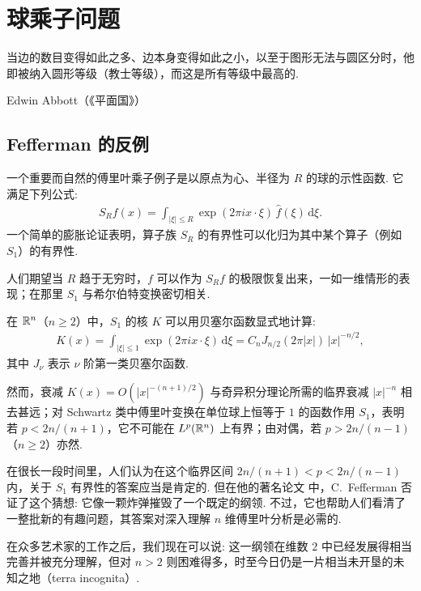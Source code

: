 
\chapter{球乘子问题}

\epigraph{当边的数目变得如此之多、边本身变得如此之小，以至于图形无法与圆区分时，他即被纳入圆形等级（教士等级），而这是所有等级中最高的.}{Edwin Abbott（《平面国》）}

\section{Fefferman 的反例}

一个重要而自然的傅里叶乘子例子是以原点为心、半径为 $R$ 的球的示性函数. 它满足下列公式:
\begin{align*}
  S_{R}f(x)=\int_{|\xi|\leq R}\exp(2\pi i x\cdot\xi)\,\widehat{f}(\xi)\,\mathrm{d}\xi.
\end{align*}
一个简单的膨胀论证表明，算子族 $S_{R}$ 的有界性可以化归为其中某个算子（例如 $S_{1}$）的有界性.

人们期望当 $R$ 趋于无穷时，$f$ 可以作为 $S_{R}f$ 的极限恢复出来，一如一维情形的表现；在那里 $S_{1}$ 与希尔伯特变换密切相关.

在 $\mathbb{R}^n$（$n \geq 2$）中，$S_1$ 的核 $K$ 可以用贝塞尔函数显式地计算:
\begin{align*}
  K(x)=\int_{|\xi|\leq 1}\exp(2\pi i x\cdot\xi)\,\mathrm{d}\xi=C_{n}J_{n/2}(2\pi|x|)\,|x|^{-n/2},
\end{align*}
其中 $J_{\nu}$ 表示 $\nu$ 阶第一类贝塞尔函数.

然而，衰减 $K(x) = O(|x|^{-(n+1)/2})$ 与奇异积分理论所需的临界衰减 $|x|^{-n}$ 相去甚远；对 Schwartz 类中傅里叶变换在单位球上恒等于 $1$ 的函数作用 $S_1$，表明若 $p < 2n/(n+1)$，它不可能在 $L^p(\mathbb{R}^n)$ 上有界；由对偶，若 $p > 2n/(n-1)$（$n \geq 2$）亦然.

在很长一段时间里，人们认为在这个临界区间 $2n/(n+1) < p < 2n/(n-1)$ 内，关于 $S_1$ 有界性的答案应当是肯定的. 但在他的著名论文 \cite{b115} 中，C.~Fefferman 否证了这个猜想: 它像一颗炸弹摧毁了一个既定的纲领. 不过，它也帮助人们看清了一整批新的有趣问题，其答案对深入理解 $n$ 维傅里叶分析是必需的.

在众多艺术家的工作之后，我们现在可以说: 这一纲领在维数 $2$ 中已经发展得相当完善并被充分理解，但对 $n > 2$ 则困难得多，时至今日仍是一片相当未开垦的未知之地（terra incognita）.

